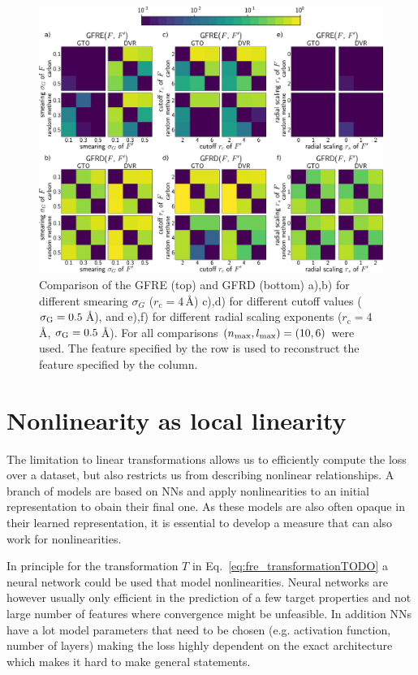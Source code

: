 \begin{figure}
    \includegraphics[width=0.9\linewidth]{fig/sigma_radial_scaling_cutoff_comparison-gfrd-gto_dvr-methane_carbon-inkscaped-v2.pdf}
    \caption{Comparison of the GFRE (top) and GFRD (bottom) a),b) for different smearing  $\sigma_G$ ($r_\text{c}=4\,$\AA{}) c),d) for different cutoff values ($\sigma_\text{G}=0.5\,$\AA), and e),f) for different radial scaling exponents ($r_\text{c}=4\,$\AA{}, $\sigma_\text{G}=0.5\,$\AA). For all comparisons $(n_\mathrm{max},l_\mathrm{max}) = (10,6)$ were used. The feature specified by the row is used to reconstruct the feature specified by the column.}
    \label{fig:soap-sigma-radial-body}
\end{figure}

\section{Nonlinearity as local linearity}
The limitation to linear transformations allows us to efficiently compute the loss over a dataset, but also restricts us from describing nonlinear relationships.
A branch of models are based on NNs and apply nonlinearities to an initial representation to obain their final one.
As these models are also often opaque in their learned representation, it is essential to develop a measure that can also work for nonlinearities.

In principle for the transformation $T$ in Eq.~\ref{eq:fre_transformationTODO} a neural network could be used that model nonlinearities.
Neural networks are however usually only efficient in the prediction of a few target properties and not large number of features where convergence might be unfeasible.
In addition NNs have a lot model parameters that need to be chosen (e.g. activation function, number of layers) making the loss highly dependent on the exact architecture which makes it hard to make general statements.

